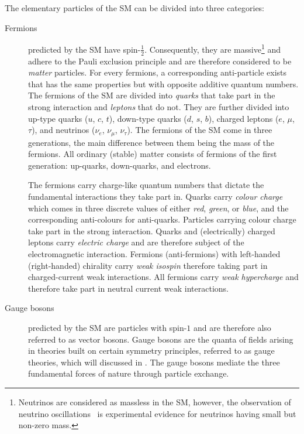 The elementary particles of the SM can be divided into three categories:
\begin{description}

\item[Fermions] predicted by the SM have spin-$\frac{1}{2}$. Consequently, they
  are massive\footnote{Neutrinos are considered as massless in the SM, however,
    the observation of neutrino
    oscillations~\cite{Super-Kamiokande:1998kpq,SNO:2002tuh} is experimental
    evidence for neutrinos having small but non-zero mass.} and adhere to the
  Pauli exclusion principle and are therefore considered to be \emph{matter}
  particles. For every fermions, a corresponding anti-particle exists that has
  the same properties but with opposite additive quantum numbers. The fermions
  of the SM are divided into \emph{quarks} that take part in the strong
  interaction and \emph{leptons} that do not. They are further divided into
  up-type quarks ($u$, $c$, $t$), down-type quarks ($d$, $s$, $b$), charged
  leptons ($e$, $\mu$, $\tau$), and neutrinos ($\nu_e$, $\nu_\mu$,
  $\nu_\tau$). The fermions of the SM come in three generations, the main
  difference between them being the mass of the fermions. All ordinary (stable)
  matter consists of fermions of the first generation: up-quarks, down-quarks,
  and electrons.

  The fermions carry charge-like quantum numbers that dictate the fundamental
  interactions they take part in. Quarks carry \emph{colour charge} which comes
  in three discrete values of either \emph{red}, \emph{green}, or \emph{blue},
  and the corresponding anti-colours for anti-quarks. Particles carrying colour
  charge take part in the strong interaction. Quarks and (electrically) charged
  leptons carry \emph{electric charge} and are therefore subject of the
  electromagnetic interaction. Fermions (anti-fermions) with left-handed
  (right-handed) chirality carry \emph{weak isospin} therefore taking part in
  charged-current weak interactions. All fermions carry \emph{weak hypercharge}
  and therefore take part in neutral current weak interactions.

\item[Gauge bosons] predicted by the SM are particles with spin-$1$ and are
  therefore also referred to as vector bosons. Gauge bosons are the quanta of
  fields arising in theories built on certain symmetry principles, referred to
  as gauge theories, which will discussed in
  . The gauge bosons mediate the three
  fundamental forces of nature through particle exchange.


\end{description}
